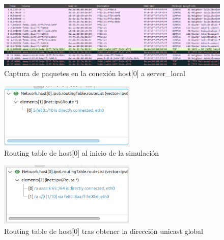 \begin{figure}[H]
    \centering
    \includegraphics[width=135mm, scale=0.75]{imaxes/ejercicio2_7_2.png}
    \caption{Captura de paquetes en la conexión host[0] a server\_local}
    \label{fig:conexion_serverLocal}
\end{figure}

\begin{figure}[H]
    \centering
    \includegraphics[width=65mm, scale=0.75]{imaxes/fallo1.png}
    \caption{Routing table de host[0] al inicio de la simulación}
    \label{fig:fallo1}
\end{figure}

\begin{figure}[H]
    \centering
    \includegraphics[width=65mm, scale=0.75]{imaxes/fallo2.png}
    \caption{Routing table de host[0] tras obtener la dirección unicast global}
    \label{fig:fallo2}
\end{figure}
